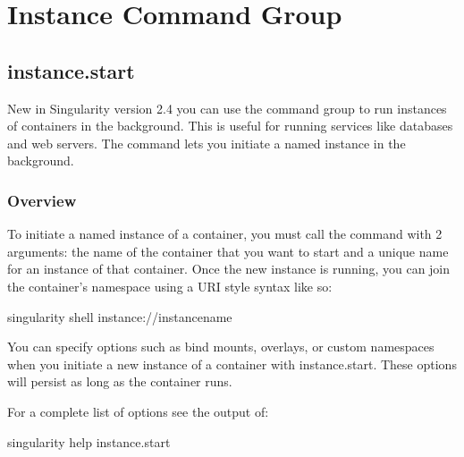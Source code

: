 \documentclass[letterpaper,10pt,english]{sphinxmanual}
\begin{document}
\section{Instance Command Group}
\label{\detokenize{appendix:instance-command-group}}\label{\detokenize{appendix:id42}}\label{\detokenize{appendix:sec-instances}}

\subsection{instance.start}
\label{\detokenize{appendix:instance-start}}\label{\detokenize{appendix:sec-instances}}\label{\detokenize{appendix:id43}}
New in Singularity version 2.4 you can use the  command group to run
instances of containers in the background. This is useful for running
services like databases and web servers. The  command lets you initiate a
named instance in the background.


\subsubsection{Overview}
\label{\detokenize{appendix:id44}}
To initiate a named instance of a container, you must call the  command
with 2 arguments: the name of the container that you want to start and a
unique name for an instance of that container. Once the new instance is
running, you can join the container’s namespace using a URI style syntax
like so:

%
\begin{sphinxVerbatim}[commandchars=\\\{\}]
\PYGZdl{} singularity shell instance://\PYGZlt{}instance\PYGZus{}name\PYGZgt{}
\end{sphinxVerbatim}

You can specify options such as bind mounts, overlays, or custom
namespaces when you initiate a new instance of a container with
instance.start. These options will persist as long as the container
runs.

For a complete list of options see the output of:

%
\begin{sphinxVerbatim}[commandchars=\\\{\}]
singularity help instance.start
\end{sphinxVerbatim}
\end{document}
